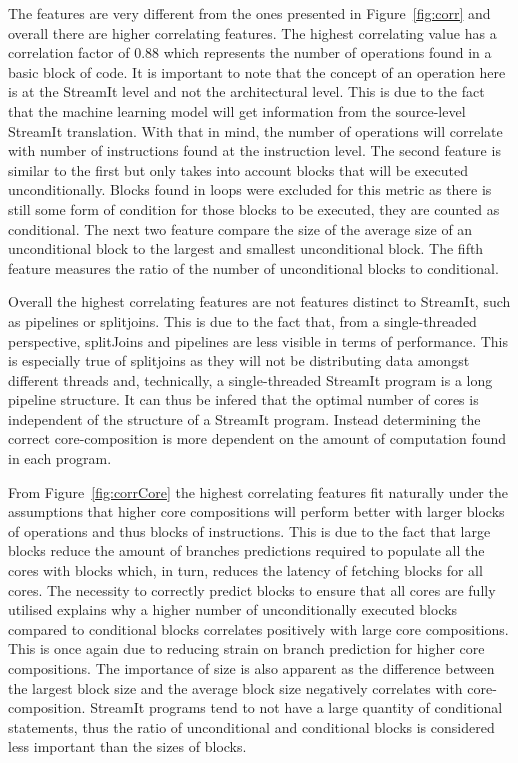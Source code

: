 The features are very different from the ones presented in Figure~\ref{fig:corr} and overall there are higher correlating features.
The highest correlating value has a correlation factor of 0.88 which represents the number of operations found in a basic block of code.
It is important to note that the concept of an operation here is at the StreamIt level and not the architectural level.
This is due to the fact that the machine learning model will get information from the source-level StreamIt translation.
With that in mind, the number of operations will correlate with number of instructions found at the instruction level.
The second feature is similar to the first but only takes into account blocks that will be executed unconditionally.
Blocks found in loops were excluded for this metric as there is still some form of condition for those blocks to be executed, they are counted as conditional.
The next two feature compare the size of the average size of an unconditional block to the largest and smallest unconditional block.
The fifth feature measures the ratio of the number of unconditional blocks to conditional.

Overall the highest correlating features are not features distinct to StreamIt, such as pipelines or splitjoins.
This is due to the fact that, from a single-threaded perspective, splitJoins and pipelines are less visible in terms of performance.
This is especially true of splitjoins as they will not be distributing data amongst different threads and, technically, a single-threaded StreamIt program is a long pipeline structure.
It can thus be infered that the optimal number of cores is independent of the structure of a StreamIt program.
Instead determining the correct core-composition is more dependent on the amount of computation found in each program.

From Figure~\ref{fig:corrCore} the highest correlating features fit naturally under the assumptions that higher core compositions will perform better with larger blocks of operations and thus blocks of instructions.
This is due to the fact that large blocks reduce the amount of branches predictions required to populate all the cores with blocks which, in turn, reduces the latency of fetching blocks for all cores.
The necessity to correctly predict blocks to ensure that all cores are fully utilised explains why a higher number of unconditionally executed blocks compared to conditional blocks correlates positively with large core compositions.
This is once again due to reducing strain on branch prediction for higher core compositions.
The importance of size is also apparent as the difference between the largest block size and the average block size negatively correlates with core-composition.
StreamIt programs tend to not have a large quantity of conditional statements, thus the ratio of unconditional and conditional blocks is considered less important than the sizes of blocks.


